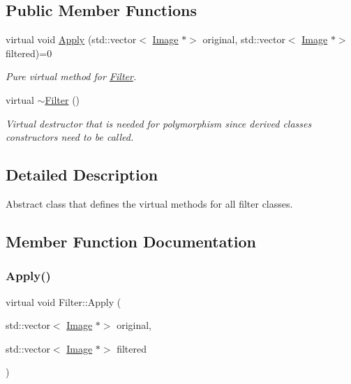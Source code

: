 \subsection*{Public Member Functions}
\begin{DoxyCompactItemize}
\item 
virtual void \hyperlink{classFilter_afab0d50af44a19a370ebe46c69b8ff4e}{Apply} (std\+::vector$<$ \hyperlink{classImage}{Image} $\ast$$>$ original, std\+::vector$<$ \hyperlink{classImage}{Image} $\ast$$>$ filtered)=0
\begin{DoxyCompactList}\small\item\em Pure virtual method for \hyperlink{classFilter}{Filter}. \end{DoxyCompactList}\item 
\mbox{\label{classFilter_aa37dc017d133404b3a326f363ce36b8a}} 
virtual \hyperlink{classFilter_aa37dc017d133404b3a326f363ce36b8a}{$\sim$\+Filter} ()
\begin{DoxyCompactList}\small\item\em Virtual destructor that is needed for polymorphism since derived classes constructors need to be called. \end{DoxyCompactList}\end{DoxyCompactItemize}


\subsection{Detailed Description}
Abstract class that defines the virtual methods for all filter classes. 

\subsection{Member Function Documentation}
\mbox{\label{classFilter_afab0d50af44a19a370ebe46c69b8ff4e}} 
\subsubsection{\texorpdfstring{Apply()}{Apply()}}
{\footnotesize\ttfamily virtual void Filter\+::\+Apply (\begin{DoxyParamCaption}\item[{std\+::vector$<$ \hyperlink{classImage}{Image} $\ast$$>$}]{original,  }\item[{std\+::vector$<$ \hyperlink{classImage}{Image} $\ast$$>$}]{filtered }\end{DoxyParamCaption})\hspace{0.3cm}{\ttfamily [pure virtual]}}



